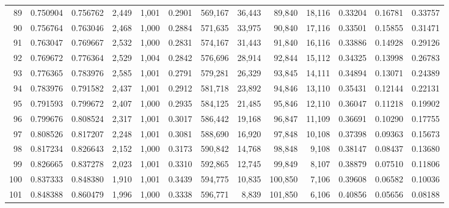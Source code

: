\begin{tabular}{rrrrrrrrrrrrr}
89  &  0.750904 &  0.756762 &   2,449 &  1,001 &                                     0.2901 &  569,167 &   36,443 &   89,840 &   18,116 &  0.33204 &  0.16781 &  0.33757 \\
90  &  0.756764 &  0.763046 &   2,468 &  1,000 &                                     0.2884 &  571,635 &   33,975 &   90,840 &   17,116 &  0.33501 &  0.15855 &  0.31471 \\
91  &  0.763047 &  0.769667 &   2,532 &  1,000 &                                     0.2831 &  574,167 &   31,443 &   91,840 &   16,116 &  0.33886 &  0.14928 &  0.29126 \\
92  &  0.769672 &  0.776364 &   2,529 &  1,004 &                                     0.2842 &  576,696 &   28,914 &   92,844 &   15,112 &  0.34325 &  0.13998 &  0.26783 \\
93  &  0.776365 &  0.783976 &   2,585 &  1,001 &                                     0.2791 &  579,281 &   26,329 &   93,845 &   14,111 &  0.34894 &  0.13071 &  0.24389 \\
94  &  0.783976 &  0.791582 &   2,437 &  1,001 &                                     0.2912 &  581,718 &   23,892 &   94,846 &   13,110 &  0.35431 &  0.12144 &  0.22131 \\
95  &  0.791593 &  0.799672 &   2,407 &  1,000 &                                     0.2935 &  584,125 &   21,485 &   95,846 &   12,110 &  0.36047 &  0.11218 &  0.19902 \\
96  &  0.799676 &  0.808524 &   2,317 &  1,001 &                                     0.3017 &  586,442 &   19,168 &   96,847 &   11,109 &  0.36691 &  0.10290 &  0.17755 \\
97  &  0.808526 &  0.817207 &   2,248 &  1,001 &                                     0.3081 &  588,690 &   16,920 &   97,848 &   10,108 &  0.37398 &  0.09363 &  0.15673 \\
98  &  0.817234 &  0.826643 &   2,152 &  1,000 &                                     0.3173 &  590,842 &   14,768 &   98,848 &    9,108 &  0.38147 &  0.08437 &  0.13680 \\
99  &  0.826665 &  0.837278 &   2,023 &  1,001 &                                     0.3310 &  592,865 &   12,745 &   99,849 &    8,107 &  0.38879 &  0.07510 &  0.11806 \\
100 &  0.837333 &  0.848380 &   1,910 &  1,001 &                                     0.3439 &  594,775 &   10,835 &  100,850 &    7,106 &  0.39608 &  0.06582 &  0.10036 \\
101 &  0.848388 &  0.860479 &   1,996 &  1,000 &                                     0.3338 &  596,771 &    8,839 &  101,850 &    6,106 &  0.40856 &  0.05656 &  0.08188 \\

\end{tabular}

